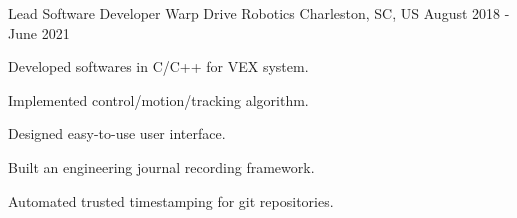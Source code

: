 

\begin{cventries}

  \cventry
    {Lead Software Developer} %
    {Warp Drive Robotics} %
    {Charleston, SC, US} %
    {August 2018 - June 2021} %
    {
      \begin{cvitems} %
        \item {Developed softwares in C/C++ for VEX system.}
        \item {Implemented control/motion/tracking algorithm.}
        \item {Designed easy-to-use user interface.}
        \item {Built an engineering journal recording framework.}
        \item {Automated trusted timestamping for git repositories.}
      \end{cvitems}
    }

\end{cventries}
